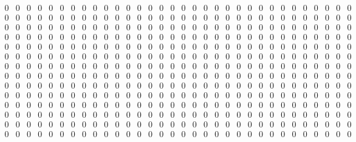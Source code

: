 \documentclass[11pt, a4paper]{article}
\begin{document}
\begin{sloppypar}
\begin{figure}[ht]
\[\begin{smallmatrix}
          0     & 0 & 0     & 0 & 0 & 0 & 0 & 0 & 0 & 0 & 0 & 0 & 0 & 0 & 0 & 0 & 0 & 0 & 0 & 0 & 0 & 0 & 0 & 0 & 0     & 0 & 0 & 0 & 0 & 0 & 0 & 0     \\
          0     & 0 & 0     & 0 & 0 & 0 & 0 & 0 & 0 & 0 & 0 & 0 & 0 & 0 & 0 & 0 & 0 & 0 & 0 & 0 & 0 & 0 & 0 & 0 & 0     & 0 & 0 & 0 & 0 & 0 & 0 & 0     \\
          0     & 0 & 0     & 0 & 0 & 0 & 0 & 0 & 0 & 0 & 0 & 0 & 0 & 0 & 0 & 0 & 0 & 0 & 0 & 0 & 0 & 0 & 0 & 0 & 0     & 0 & 0 & 0 & 0 & 0 & 0 & 0     \\
          0     & 0 & 0     & 0 & 0 & 0 & 0 & 0 & 0 & 0 & 0 & 0 & 0 & 0 & 0 & 0 & 0 & 0 & 0 & 0 & 0 & 0 & 0 & 0 & 0     & 0 & 0 & 0 & 0 & 0 & 0 & 0     \\
          0     & 0 & 0     & 0 & 0 & 0 & 0 & 0 & 0 & 0 & 0 & 0 & 0 & 0 & 0 & 0 & 0 & 0 & 0 & 0 & 0 & 0 & 0 & 0 & 0     & 0 & 0 & 0 & 0 & 0 & 0 & 0     \\
          0     & 0 & 0     & 0 & 0 & 0 & 0 & 0 & 0 & 0 & 0 & 0 & 0 & 0 & 0 & 0 & 0 & 0 & 0 & 0 & 0 & 0 & 0 & 0 & 0     & 0 & 0 & 0 & 0 & 0 & 0 & 0     \\
          0     & 0 & 0     & 0 & 0 & 0 & 0 & 0 & 0 & 0 & 0 & 0 & 0 & 0 & 0 & 0 & 0 & 0 & 0 & 0 & 0 & 0 & 0 & 0 & 0     & 0 & 0 & 0 & 0 & 0 & 0 & 0     \\
          0     & 0 & 0     & 0 & 0 & 0 & 0 & 0 & 0 & 0 & 0 & 0 & 0 & 0 & 0 & 0 & 0 & 0 & 0 & 0 & 0 & 0 & 0 & 0 & 0     & 0 & 0 & 0 & 0 & 0 & 0 & 0     \\
          0     & 0 & 0     & 0 & 0 & 0 & 0 & 0 & 0 & 0 & 0 & 0 & 0 & 0 & 0 & 0 & 0 & 0 & 0 & 0 & 0 & 0 & 0 & 0 & 0     & 0 & 0 & 0 & 0 & 0 & 0 & 0     \\
          0     & 0 & 0     & 0 & 0 & 0 & 0 & 0 & 0 & 0 & 0 & 0 & 0 & 0 & 0 & 0 & 0 & 0 & 0 & 0 & 0 & 0 & 0 & 0 & 0     & 0 & 0 & 0 & 0 & 0 & 0 & 0     \\
          0     & 0 & 0     & 0 & 0 & 0 & 0 & 0 & 0 & 0 & 0 & 0 & 0 & 0 & 0 & 0 & 0 & 0 & 0 & 0 & 0 & 0 & 0 & 0 & 0     & 0 & 0 & 0 & 0 & 0 & 0 & 0     \\
          0     & 0 & 0     & 0 & 0 & 0 & 0 & 0 & 0 & 0 & 0 & 0 & 0 & 0 & 0 & 0 & 0 & 0 & 0 & 0 & 0 & 0 & 0 & 0 & 0     & 0 & 0 & 0 & 0 & 0 & 0 & 0     \\
          0     & 0 & 0     & 0 & 0 & 0 & 0 & 0 & 0 & 0 & 0 & 0 & 0 & 0 & 0 & 0 & 0 & 0 & 0 & 0 & 0 & 0 & 0 & 0 & 0     & 0 & 0 & 0 & 0 & 0 & 0 & 0     \\
          0     & 0 & 0     & 0 & 0 & 0 & 0 & 0 & 0 & 0 & 0 & 0 & 0 & 0 & 0 & 0 & 0 & 0 & 0 & 0 & 0 & 0 & 0 & 0 & 0     & 0 & 0 & 0 & 0 & 0 & 0 & 0     \\

\end{smallmatrix}\]
\end{figure}
\end{sloppypar}
\end{document}
